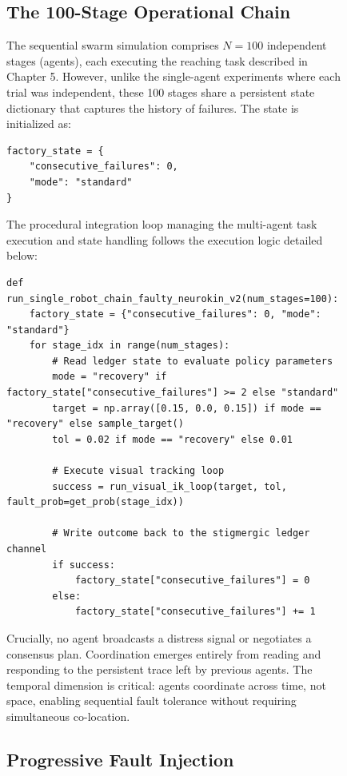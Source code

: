 \documentclass[12pt,a4paper,oneside]{report}
\begin{document}
\begin{figure}[H]
\subsection{The 100-Stage Operational Chain}

The sequential swarm simulation comprises $N = 100$ independent stages (agents), each executing the reaching task described in Chapter 5. However, unlike the single-agent experiments where each trial was independent, these 100 stages share a persistent state dictionary that captures the history of failures. The state is initialized as:
\begin{verbatim}
factory_state = {
    "consecutive_failures": 0,
    "mode": "standard"
}
\end{verbatim}

The procedural integration loop managing the multi-agent task execution and state handling follows the execution logic detailed below:
\begin{minipage}{\linewidth}
\begin{verbatim}
def run_single_robot_chain_faulty_neurokin_v2(num_stages=100):
    factory_state = {"consecutive_failures": 0, "mode": "standard"}
    for stage_idx in range(num_stages):
        # Read ledger state to evaluate policy parameters
        mode = "recovery" if factory_state["consecutive_failures"] >= 2 else "standard"
        target = np.array([0.15, 0.0, 0.15]) if mode == "recovery" else sample_target()
        tol = 0.02 if mode == "recovery" else 0.01
        
        # Execute visual tracking loop
        success = run_visual_ik_loop(target, tol, fault_prob=get_prob(stage_idx))
        
        # Write outcome back to the stigmergic ledger channel
        if success:
            factory_state["consecutive_failures"] = 0
        else:
            factory_state["consecutive_failures"] += 1
\end{verbatim}
\end{minipage}

Crucially, no agent broadcasts a distress signal or negotiates a consensus plan. Coordination emerges entirely from reading and responding to the persistent trace left by previous agents. The temporal dimension is critical: agents coordinate across time, not space, enabling sequential fault tolerance without requiring simultaneous co-location.

\subsection{Progressive Fault Injection}


\end{figure}
\end{document}
